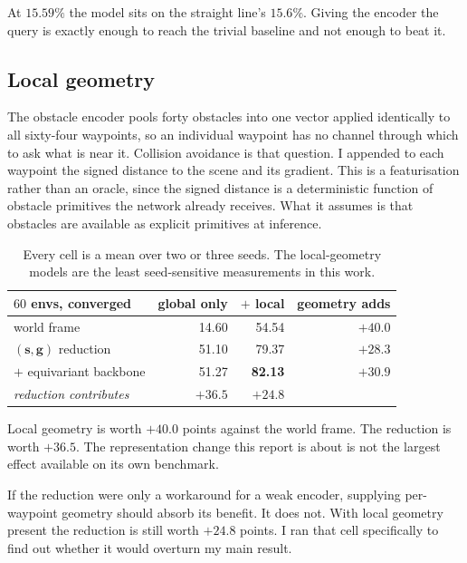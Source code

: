 \documentclass[11pt,a4paper]{article}
\newcommand{\toprule}{\hline}
\newcommand{\midrule}{\hline}
\newcommand{\bottomrule}{\hline}
\newcommand{\svec}{\mathbf{s}}
\newcommand{\gvec}{\mathbf{g}}
\begin{document}
At $15.59\%$ the model sits on the straight line's $15.6\%$. Giving the encoder the
query is exactly enough to reach the trivial baseline and not enough to beat it.

\subsection{Local geometry}
\label{sec:localgeom}

The obstacle encoder pools forty obstacles into one vector applied identically to
all sixty-four waypoints, so an individual waypoint has no channel through which
to ask what is near it. Collision avoidance is that question. I appended to each
waypoint the signed distance to the scene and its gradient. This is a
featurisation rather than an oracle, since the signed distance is a deterministic
function of obstacle primitives the network already receives. What it assumes is
that obstacles are available as explicit primitives at inference.

\begin{table}[t]
\centering\small
\begin{tabular}{lrrr}
\toprule
$60$ envs, converged & global only & $+$ local & geometry adds \\
\midrule
world frame                    & 14.60 & 54.54 & $+40.0$ \\
$(\svec,\gvec)$ reduction      & 51.10 & 79.37 & $+28.3$ \\
\quad $+$ equivariant backbone & 51.27 & \textbf{82.13} & $+30.9$ \\
\midrule
\emph{reduction contributes}   & $+36.5$ & $+24.8$ & \\
\bottomrule
\end{tabular}
\caption{Every cell is a mean over two or three seeds. The local-geometry models
are the least seed-sensitive measurements in this work.}
\label{tab:localgeom}
\end{table}

Local geometry is worth $+40.0$ points against the world frame. The reduction is
worth $+36.5$. The representation change this report is about is not the largest
effect available on its own benchmark.

If the reduction were only a workaround for a weak encoder, supplying
per-waypoint geometry should absorb its benefit. It does not. With local geometry
present the reduction is still worth $+24.8$ points. I ran that cell specifically
to find out whether it would overturn my main result.
\end{document}
